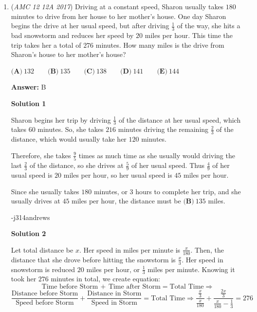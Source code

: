 \begin{enumerate}
 


 



\textbf{Solution 2}

In order for at least $5$ horses to finish simultaneously, the current time needs to have at least $5$ divisors. Thus the number must have a form of either $p^4$ or $p^2*q$, which have $5$ and $6$ factors respectively. The smallest number of the first form is $16$, and the smallest number of the second form is $12.$  Thus, our answer is $1+2=\boxed{\textbf{(B) } 3}$.

 


	\item (\textit{AMC 12 12A 2017}) Driving at a constant speed, Sharon usually takes $180$ minutes to drive from her house to her mother's house. One day Sharon begins the drive at her usual speed, but after driving $\frac{1}{3}$ of the way, she hits a bad snowstorm and reduces her speed by $20$ miles per hour. This time the trip takes her a total of $276$ minutes. How many miles is the drive from Sharon's house to her mother's house?


 $\textbf{(A)}\ 132 \qquad\textbf{(B)}\ 135 \qquad\textbf{(C)}\ 138 \qquad\textbf{(D)}\ 141 \qquad\textbf{(E)}\ 144$

 \textbf{Answer: }B



\textbf{Solution 1}

Sharon begins her trip by driving $\frac{1}{3}$ of the distance at her usual speed, which takes $60$ minutes.  So, she takes $216$ minutes driving the remaining $\frac{2}{3}$ of the distance, which would usually take her $120$ minutes.  

 Therefore, she takes $\frac{9}{5}$ times as much time as she usually would driving the last $\frac{2}{3}$ of the distance, so she drives at $\frac{5}{9}$ of her usual speed.  Thus $\frac{4}{9}$ of her usual speed is $20$ miles per hour, so her usual speed is $45$ miles per hour.  

 Since she usually takes $180$ minutes, or $3$ hours to complete her trip, and she usually drives at $45$ miles per hour, the distance must be $\boxed{\textbf{(B)}\ 135}$ miles.  

 -j314andrews

 



\textbf{Solution 2}

Let total distance be $x$. Her speed in miles per minute is $\frac{x}{180}$. Then, the distance that she drove before hitting the snowstorm is $\frac{x}{3}$. Her speed in snowstorm is reduced $20$ miles per hour, or $\frac{1}{3}$ miles per minute. Knowing it took her $276$ minutes in total, we create equation: 
 \[\text{Time before Storm}\, + \, \text{Time after Storm} = \text{Total Time} \Longrightarrow\]
 \[\frac{\text{Distance before Storm}}{\text{Speed before Storm}} + \frac{\text{Distance in Storm}}{\text{Speed in Storm}} = \text{Total Time} \Longrightarrow \frac{\frac{x}{3}}{\frac{x}{180}} + \frac{\frac{2x}{3}}{\frac{x}{180} - \frac{1}{3}} = 276\]


\end{enumerate}
